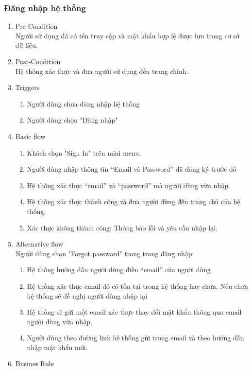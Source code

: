 \subsubsection{Đăng nhập hệ thống}
\begin{enumerate}
	\item Pre-Condition\\
	Người sử dụng đã có tên truy cập và mật khẩu hợp lệ được lưu trong cơ sở dữ liệu.
	\item Post-Condition\\
	Hệ thống xác thực và đưa người sử dụng đến trang chính.
	\item Triggers
		\begin{enumerate}
			\item Người dùng chưa đăng nhập hệ thống
			\item Người dùng chọn "Đăng nhập"
		\end{enumerate}
	\item Basic flow
	\begin{enumerate}
		\item Khách chọn "Sign In" trên mini menu.
		\item Người dùng nhập thông tin “Email và Password” đã đăng ký trước đó
		\item Hệ thống xác thực “email” và “password” mà người dùng vừa nhập.
		\item Hệ thống xác thực thành công và đưa người dùng đến trang chủ của hệ thống.
		\item Xác thực không thành công: Thông báo lỗi và yêu cầu nhập lại.
	\end{enumerate}
	\item Alternative flow\\
	Người dùng chọn "Forgot password" trong trang đăng nhập:
	\begin{enumerate}
		\item Hệ thống hướng dẫn người dùng điền “email” của người dùng
		\item Hệ thống xác thực email đó có tồn tại trong hệ thống hay chưa. Nếu chưa hệ thống sẽ đề nghị người dùng nhập lại
		\item Hệ thống sẽ gửi một email xác thực thay đổi mật khẩu thông qua email người dùng vừa nhập.
		\item Người dùng theo đường link hệ thống gửi trong email và theo hướng dẫn nhập mật khẩu mới.
	\end{enumerate}
	\item Busines Rule
\end{enumerate}

